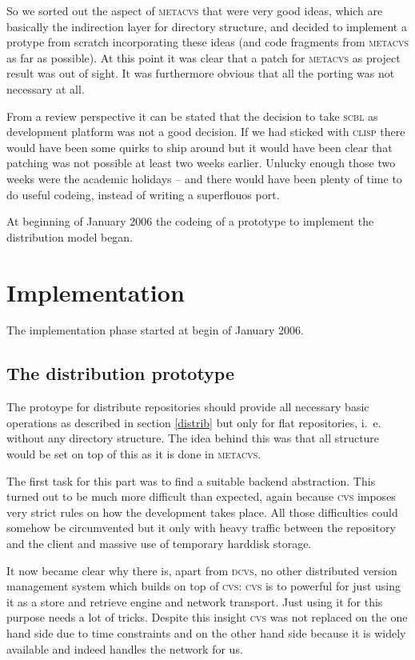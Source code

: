 \documentclass[fleqn, 10pt, a4paper]{report} \usepackage{amssymb}
\begin{document}
So we sorted out the aspect of \textsc{metacvs} that were very good
ideas, which are basically the indirection layer for directory
structure, and decided to implement a protype from scratch
incorporating these ideas (and code fragments from \textsc{metacvs} as
far as possible). At this point it was clear that a patch for
\textsc{metacvs} as project result was out of sight. It was
furthermore obvious that all the porting was not necessary at all.

From a review perspective it can be stated that the decision to take
\textsc{scbl} as development platform was not a good decision. If we
had sticked with \textsc{clisp} there would have been some quirks to
ship around but it would have been clear that patching was not
possible at least two weeks earlier. Unlucky enough those two weeks
were the academic holidays -- and there would have been plenty of time
to do useful codeing, instead of writing a superflouos port.

At beginning of January 2006 the codeing of a prototype to implement
the distribution model began.

\section{Implementation}

The implementation phase started at begin of January 2006.

\subsection{The distribution prototype}

The protoype for distribute repositories should provide all necessary
basic operations as described in section \ref{distrib} but only for
flat repositories, i.~e. without any directory structure. The idea
behind this was that all structure would be set on top of this as it
is done in \textsc{metacvs}.

The first task for this part was to find a suitable backend
abstraction. This turned out to be much more difficult than expected,
again because \textsc{cvs} imposes very strict rules on how the
development takes place. All those difficulties could somehow be
circumvented but it only with heavy traffic between the repository and
the client and massive use of temporary harddisk storage.

It now became clear why there is, apart from \textsc{dcvs}, no other
distributed version management system which builds on top of
\textsc{cvs}: \textsc{cvs} is to powerful for just using it as a store
and retrieve engine and network transport. Just using it for this
purpose needs a lot of tricks. Despite this insight \textsc{cvs} was
not replaced on the one hand side due to time constraints and on the
other hand side because it is widely available and indeed handles the
network for us.
\end{document}
